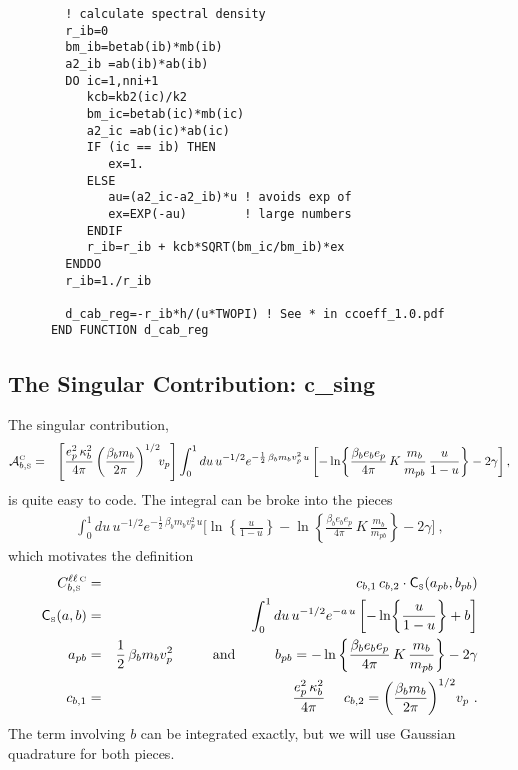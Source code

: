 \documentclass[preprint,12pt,eqsecnum,nofootinbib,amsmath,amssymb]{revtex4}
\newcommand{\smC}{{\rm\scriptscriptstyle C}}
\newcommand{\smS}{{\rm\scriptscriptstyle S}}
\begin{document}
{{{\begin{verbatim}
        ! calculate spectral density
        r_ib=0
        bm_ib=betab(ib)*mb(ib)
        a2_ib =ab(ib)*ab(ib)
        DO ic=1,nni+1
           kcb=kb2(ic)/k2
           bm_ic=betab(ic)*mb(ic)
           a2_ic =ab(ic)*ab(ic)
           IF (ic == ib) THEN
              ex=1.
           ELSE
              au=(a2_ic-a2_ib)*u ! avoids exp of 
              ex=EXP(-au)        ! large numbers
           ENDIF
           r_ib=r_ib + kcb*SQRT(bm_ic/bm_ib)*ex
        ENDDO      
        r_ib=1./r_ib 

        d_cab_reg=-r_ib*h/(u*TWOPI) ! See * in ccoeff_1.0.pdf
      END FUNCTION d_cab_reg
\end{verbatim}
}




\subsection{The Singular Contribution: c\_sing}

The singular contribution,
\begin{eqnarray}
  {\cal A}^\smC_{b,\smS} 
  &=& 
  \left[
  \frac{e_p^2\, \kappa_b^2}{4\pi}
  \left( \frac{\beta_b m_b}{2\pi} \right)^{1/2} \!\! v_p
  \right]
  \int_0^1 du\, u^{-1/2} e^{-\frac{1}{2}\, \beta_b m_b v_p^2 \,u}
  \left[-\ln\!\left\{\frac{\beta_b e_b e_p}{4\pi}\,K\,
  \frac{m_b}{m_{pb}}\,\frac{u}{1-u} \right\} 
  -2\gamma
  \right] ,
\nonumber\\
\end{eqnarray}
is quite easy to code. The integral can be broke into the pieces
\begin{eqnarray}
  \int_0^1 du\, u^{-1/2} e^{-\frac{1}{2}\, \beta_b m_b v_p^2 \,u}
  \Bigg[\ln\!\left\{\frac{u}{1-u} \right\} 
  -\ln\left\{\frac{\beta_b e_b e_p}{4\pi}\,K\,
  \frac{m_b}{m_{pb}}\right\} 
  -2\gamma \Bigg] \ ,
\end{eqnarray}
which motivates the definition
\begin{eqnarray}
  C^{\ell\ell \, \smC}_{b,\smS} 
  &=& 
  c_{b, 1}\, c_{b, 2} 
  \cdot 
  {\sf C}_\smS(a_{pb},b_{pb})
\\
  {\sf C}_\smS(a,b)
  &=&
  \int_0^1 du\, u^{-1/2} e^{-a \,u}
  \left[-\ln\!\left\{\frac{u}{1-u} \right\} + b \right]
\\
  a_{pb} &=& \frac{1}{2}\, \beta_b m_b v_p^2
  \hskip1cm 
  \text{and}
  \hskip1cm 
  b_{pb} =
  -\ln\left\{\frac{\beta_b e_b e_p}{4\pi}\,K\,
  \frac{m_b}{m_{pb}}\right\} -2\gamma 
\\
  c_{b, 1} &=& \frac{e_p^2\, \kappa_b^2}{4\pi}
  ~~~~
  c_{b, 2} =
  \left( \frac{\beta_b m_b}{2\pi} \right)^{1/2} \! v_p  \ .
\end{eqnarray}
The term involving $b$ can be integrated exactly, but we will use
Gaussian quadrature for both pieces. 

}}
\end{document}
